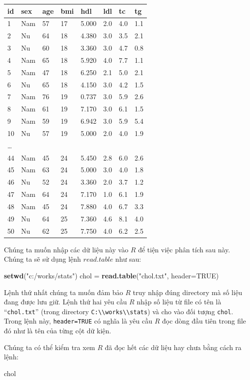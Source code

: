 \documentclass[
]{book}
\newenvironment{Shaded}{\begin{snugshade}}{\end{snugshade}}
\newcommand{\DataTypeTok}[1]{\textcolor[rgb]{0.13,0.29,0.53}{#1}}
\newcommand{\KeywordTok}[1]{\textcolor[rgb]{0.13,0.29,0.53}{\textbf{#1}}}
\newcommand{\NormalTok}[1]{#1}
\newcommand{\OtherTok}[1]{\textcolor[rgb]{0.56,0.35,0.01}{#1}}
\newcommand{\StringTok}[1]{\textcolor[rgb]{0.31,0.60,0.02}{#1}}
\begin{document}
\begin{longtable}[]{@{}llllllll@{}}
\toprule
id & sex & age & bmi & hdl & ldl & tc & tg\tabularnewline
\midrule
\endhead
1 & Nam & 57 & 17 & 5.000 & 2.0 & 4.0 & 1.1\tabularnewline
2 & Nu & 64 & 18 & 4.380 & 3.0 & 3.5 & 2.1\tabularnewline
3 & Nu & 60 & 18 & 3.360 & 3.0 & 4.7 & 0.8\tabularnewline
4 & Nam & 65 & 18 & 5.920 & 4.0 & 7.7 & 1.1\tabularnewline
5 & Nam & 47 & 18 & 6.250 & 2.1 & 5.0 & 2.1\tabularnewline
6 & Nu & 65 & 18 & 4.150 & 3.0 & 4.2 & 1.5\tabularnewline
7 & Nam & 76 & 19 & 0.737 & 3.0 & 5.9 & 2.6\tabularnewline
8 & Nam & 61 & 19 & 7.170 & 3.0 & 6.1 & 1.5\tabularnewline
9 & Nam & 59 & 19 & 6.942 & 3.0 & 5.9 & 5.4\tabularnewline
10 & Nu & 57 & 19 & 5.000 & 2.0 & 4.0 & 1.9\tabularnewline
\ldots{} & & & & & & &\tabularnewline
44 & Nam & 45 & 24 & 5.450 & 2.8 & 6.0 & 2.6\tabularnewline
45 & Nam & 63 & 24 & 5.000 & 3.0 & 4.0 & 1.8\tabularnewline
46 & Nu & 52 & 24 & 3.360 & 2.0 & 3.7 & 1.2\tabularnewline
47 & Nam & 64 & 24 & 7.170 & 1.0 & 6.1 & 1.9\tabularnewline
48 & Nam & 45 & 24 & 7.880 & 4.0 & 6.7 & 3.3\tabularnewline
49 & Nu & 64 & 25 & 7.360 & 4.6 & 8.1 & 4.0\tabularnewline
50 & Nu & 62 & 25 & 7.750 & 4.0 & 6.2 & 2.5\tabularnewline
\bottomrule
\end{longtable}

Chúng ta muốn nhập các dữ liệu này vào \(R\) để tiện việc phân tích sau này. Chúng ta sẽ sử dụng lệnh \(read.table\) như sau:

\begin{Shaded}
\begin{Highlighting}[]
\KeywordTok{setwd}\NormalTok{(}\StringTok{"c:/works/stats"}\NormalTok{)}
\NormalTok{chol =}\StringTok{ }\KeywordTok{read.table}\NormalTok{(}\StringTok{"chol.txt"}\NormalTok{, }\DataTypeTok{header=}\OtherTok{TRUE}\NormalTok{)}
\end{Highlighting}
\end{Shaded}

Lệnh thứ nhất chúng ta muốn đảm bảo \(R\) truy nhập đúng directory mà số liệu đang được lưu giữ. Lệnh thứ hai yêu cầu \(R\) nhập số liệu từ file có tên là ``\texttt{chol.txt}'' (trong directory \texttt{C:\textbackslash{}\textbackslash{}works\textbackslash{}\textbackslash{}stats}) và cho vào đối tượng \texttt{chol}. Trong lệnh này, \texttt{header=TRUE} có nghĩa là yêu cầu \(R\) đọc dòng đầu tiên trong file đó như là tên của từng cột dữ kiện.

Chúng ta có thể kiểm tra xem \(R\) đã đọc hết các dữ liệu hay chưa bằng cách ra lệnh:

\begin{Shaded}
\begin{Highlighting}[]
\NormalTok{chol}
\end{Highlighting}
\end{Shaded}
\end{document}
